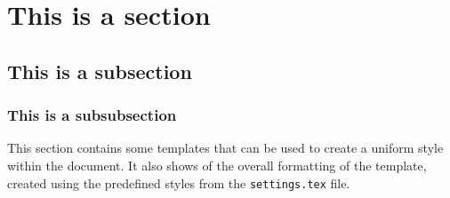 %





\section{This is a section} 
\subsection{This is a subsection}

\subsubsection{This is a subsubsection}
This section contains some templates that can be used to create a uniform style within the document. It also shows of the overall formatting of the template, created using the predefined styles from the \texttt{settings.tex} file.

